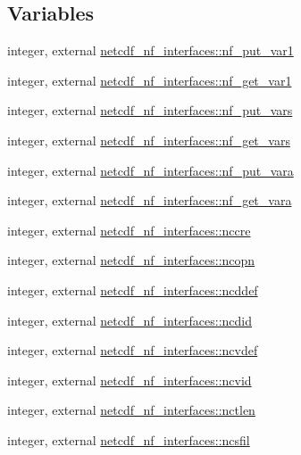 \subsection*{Variables}
\begin{DoxyCompactItemize}
\item 
integer, external \hyperlink{namespacenetcdf__nf__interfaces_ab28586e215ff7b47a47824f092ad6c3d}{netcdf\+\_\+nf\+\_\+interfaces\+::nf\+\_\+put\+\_\+var1}
\item 
integer, external \hyperlink{namespacenetcdf__nf__interfaces_ac7bad2f6b2652e7e1266d61f7bdc8849}{netcdf\+\_\+nf\+\_\+interfaces\+::nf\+\_\+get\+\_\+var1}
\item 
integer, external \hyperlink{namespacenetcdf__nf__interfaces_a6a8028b7b7144de9fe3c5483ada5215f}{netcdf\+\_\+nf\+\_\+interfaces\+::nf\+\_\+put\+\_\+vars}
\item 
integer, external \hyperlink{namespacenetcdf__nf__interfaces_a3016653fa1548d2ae9558f39ca38d2e9}{netcdf\+\_\+nf\+\_\+interfaces\+::nf\+\_\+get\+\_\+vars}
\item 
integer, external \hyperlink{namespacenetcdf__nf__interfaces_af7ac5b8300295c6a9909239706b931be}{netcdf\+\_\+nf\+\_\+interfaces\+::nf\+\_\+put\+\_\+vara}
\item 
integer, external \hyperlink{namespacenetcdf__nf__interfaces_a436c7c2250cddd5fa23233b7c3e2ba14}{netcdf\+\_\+nf\+\_\+interfaces\+::nf\+\_\+get\+\_\+vara}
\item 
integer, external \hyperlink{namespacenetcdf__nf__interfaces_a0a013492417b1babe89a2dbdb8eca4b8}{netcdf\+\_\+nf\+\_\+interfaces\+::nccre}
\item 
integer, external \hyperlink{namespacenetcdf__nf__interfaces_a057b10a968928383fda154c197079de3}{netcdf\+\_\+nf\+\_\+interfaces\+::ncopn}
\item 
integer, external \hyperlink{namespacenetcdf__nf__interfaces_a8a4ac4b41a06eaccfd346a131fd414ec}{netcdf\+\_\+nf\+\_\+interfaces\+::ncddef}
\item 
integer, external \hyperlink{namespacenetcdf__nf__interfaces_a750d36a44917a843c7d3b7d6d913cc46}{netcdf\+\_\+nf\+\_\+interfaces\+::ncdid}
\item 
integer, external \hyperlink{namespacenetcdf__nf__interfaces_afe0da902f495271e711f147b4128e17e}{netcdf\+\_\+nf\+\_\+interfaces\+::ncvdef}
\item 
integer, external \hyperlink{namespacenetcdf__nf__interfaces_a2adb0118a059b178c9927447ed736a8d}{netcdf\+\_\+nf\+\_\+interfaces\+::ncvid}
\item 
integer, external \hyperlink{namespacenetcdf__nf__interfaces_a4e214b358ce1001955e4a9b538eec4ed}{netcdf\+\_\+nf\+\_\+interfaces\+::nctlen}
\item 
integer, external \hyperlink{namespacenetcdf__nf__interfaces_a80f7509a41906746b45260d8ac63ec2b}{netcdf\+\_\+nf\+\_\+interfaces\+::ncsfil}
\end{DoxyCompactItemize}
